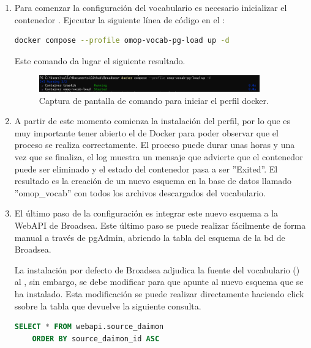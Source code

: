 \begin{enumerate}

    \item Para comenzar la configuración del vocabulario es necesario inicializar el contenedor . Ejecutar la siguiente línea de código en el :

    \begin{lstlisting}[language=sh]
    docker compose --profile omop-vocab-pg-load up -d\end{lstlisting}

    Este comando da lugar el siguiente resultado.

      \begin{figure}[H]
        \centering
        \includegraphics[width=0.90\textwidth]{figures/composeProfVocabLoad.png}
        \caption{Captura de pantalla de comando para iniciar el perfil docker.}
        \label{fig:composeProfVocabLoad}
    \end{figure}

    \item A partir de este momento comienza la instalación del perfil, por lo que es muy importante tener abierto el  de Docker para poder observar que el proceso se realiza correctamente. El proceso puede durar unas horas y una vez que se finaliza, el log muestra un mensaje que advierte que el contenedor puede ser eliminado y el estado del contenedor pasa a ser ''Exited''. El resultado es la creación de un nuevo esquema en la base de datos llamado ''omop\_vocab'' con todos los archivos descargados del vocabulario. 

    \item El último paso de la configuración es integrar este nuevo esquema a la WebAPI de Broadsea. Este último paso se puede realizar fácilmente de forma manual a través de pgAdmin, abriendo la tabla  del esquema  de la bd de Broadsea.

    La instalación por defecto de Broadsea adjudica la fuente del vocabulario () al , sin embargo, se debe modificar para que apunte al nuevo esquema  que se ha instalado. Esta modificación se puede realizar directamente haciendo click ssobre la tabla que devuelve la siguiente consulta.

    \begin{lstlisting}[language=sql]
    SELECT * FROM webapi.source_daimon
    ORDER BY source_daimon_id ASC \end{lstlisting}


\end{enumerate}
